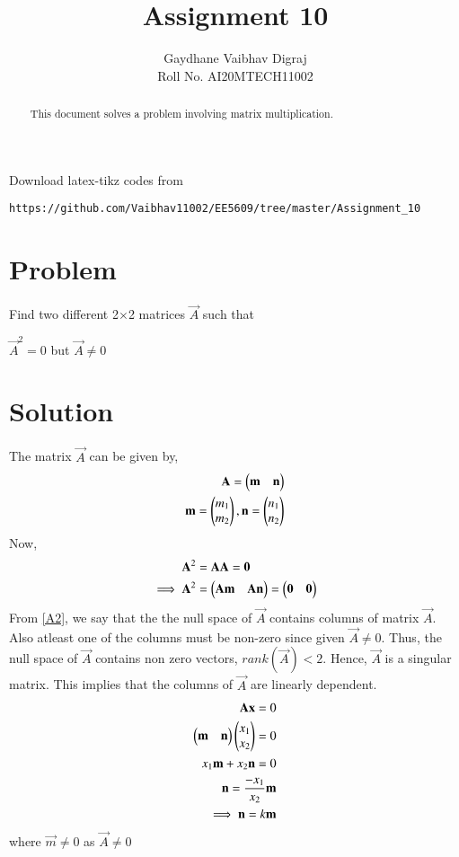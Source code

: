 \documentclass[journal,12pt,twocolumn]{IEEEtran}
\begin{document}
     \def\rightbox#1{\makebox[0in][r]{#1}}
     \def\centbox#1{\makebox[0in]{#1}}
     \def\topbox#1{\raisebox{-\baselineskip}[0in][0in]{#1}}
     \def\midbox#1{\raisebox{-0.5\baselineskip}[0in][0in]{#1}}
\vspace{3cm}
\title{Assignment 10}
\author{Gaydhane Vaibhav Digraj \\ Roll No. AI20MTECH11002}
\maketitle
\newpage
\bigskip
\renewcommand{\thefigure}{\theenumi}
\renewcommand{\thetable}{\theenumi}
\begin{abstract}
This document solves a problem involving matrix multiplication.
\end{abstract}
%
Download latex-tikz codes from 
%
\begin{lstlisting}
https://github.com/Vaibhav11002/EE5609/tree/master/Assignment_10
\end{lstlisting}
%
\section{Problem}
Find two different 2$\times$2 matrices $\vec{A}$ such that 

$\vec{A}^{2}=0$ but $\vec{A}\ne0$

\section{Solution}
The matrix $\vec{A}$ can be given by, 
\begin{align}
    \mathbf{A} = \begin{pmatrix}\mathbf{m}&\mathbf{n}\end{pmatrix} \\
    \mathbf{m} = \begin{pmatrix}m_1\\m_2\end{pmatrix}, \mathbf{n} = \begin{pmatrix}n_1\\n_2\end{pmatrix}
\end{align}
Now, 
\begin{align}
    \mathbf{A}^{2} &= \mathbf{A}\mathbf{A} = \mathbf{0} \\
    \implies\mathbf{A}^{2} &= \begin{pmatrix}\mathbf{A}\mathbf{m} & \mathbf{A}\mathbf{n}\end{pmatrix} = \begin{pmatrix}\mathbf{0}&\mathbf{0}\end{pmatrix} \label{A2}
\end{align}
From \eqref{A2}, we say that the the null space of $\vec{A}$ contains columns of matrix $\vec{A}$. Also atleast one of the columns must be non-zero since given $\vec{A}\ne0$. 
Thus, the null space of $\vec{A}$ contains non zero vectors, $rank(\vec{A})<2$. Hence, $\vec{A}$ is a singular matrix.
This implies that the columns of $\vec{A}$ are linearly dependent.
\begin{align}
    \mathbf{A}\mathbf{x}=0 \\
    \begin{pmatrix}\mathbf{m}&\mathbf{n}\end{pmatrix}\begin{pmatrix}x_1\\x_2\end{pmatrix} = 0 \\
    x_1\mathbf{m}+x_2\mathbf{n} = 0 \\
    \mathbf{n}= \frac{-x_1}{x_2}\mathbf{m} \\
    \implies\mathbf{n}=k\mathbf{m} \label{k}
\end{align}
where $\vec{m}\ne0$ as $\vec{A}\ne0$
\end{document}
